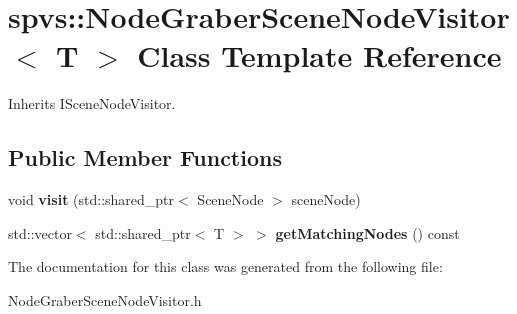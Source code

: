 \hypertarget{classspvs_1_1_node_graber_scene_node_visitor}{\section{spvs\-:\-:Node\-Graber\-Scene\-Node\-Visitor$<$ T $>$ Class Template Reference}
\label{classspvs_1_1_node_graber_scene_node_visitor}
}


Inherits I\-Scene\-Node\-Visitor.

\subsection*{Public Member Functions}
\begin{DoxyCompactItemize}
\item 
\hypertarget{classspvs_1_1_node_graber_scene_node_visitor_a43506c1d5f8e67db4fbdf858664f089e}{void {\bfseries visit} (std\-::shared\-\_\-ptr$<$ Scene\-Node $>$ scene\-Node)}\label{classspvs_1_1_node_graber_scene_node_visitor_a43506c1d5f8e67db4fbdf858664f089e}

\item 
\hypertarget{classspvs_1_1_node_graber_scene_node_visitor_aacb1e9f5418e1daf4d6e326029c41e72}{std\-::vector$<$ std\-::shared\-\_\-ptr$<$ T $>$ $>$ {\bfseries get\-Matching\-Nodes} () const }\label{classspvs_1_1_node_graber_scene_node_visitor_aacb1e9f5418e1daf4d6e326029c41e72}

\end{DoxyCompactItemize}


The documentation for this class was generated from the following file\-:\begin{DoxyCompactItemize}
\item 
Node\-Graber\-Scene\-Node\-Visitor.\-h\end{DoxyCompactItemize}
